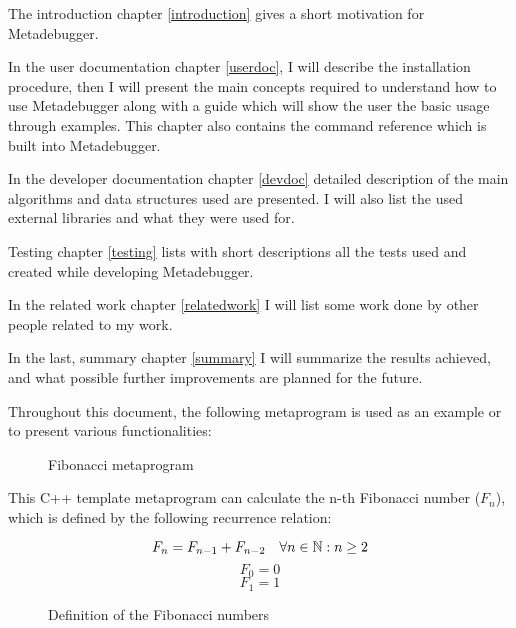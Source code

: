 The introduction chapter \ref{introduction} gives a short motivation for
Metadebugger.

In the user documentation chapter \ref{userdoc}, I will describe the
installation procedure, then I will present the main concepts required to
understand how to use Metadebugger along with a guide which will show the user
the basic usage through examples. This chapter also contains the command
reference which is built into Metadebugger.

In the developer documentation chapter \ref{devdoc} detailed description of the
main algorithms and data structures used are presented. I will also list the
used external libraries and what they were used for.

Testing chapter \ref{testing} lists with short descriptions all the tests used
and created while developing Metadebugger.

In the related work chapter \ref{relatedwork} I will list some work done by
other people related to my work.

In the last, summary chapter \ref{summary} I will summarize the results
achieved, and what possible further improvements are planned for the future.

Throughout this document, the following metaprogram is used as an example or to
present various functionalities:

\begin{figure}[H]
    \caption{Fibonacci metaprogram}
\end{figure}

This C++ template metaprogram can calculate the n-th Fibonacci number
(\(F_n\)), which is defined by the following recurrence relation:

\begin{figure}[H]
    \[
        F_n = F_{n-1} + F_{n-2} \quad \forall n \in \mathbb{N}: n \geq 2 \\
    \]
    \[
        F_0 = 0
    \]
    \[
        F_1 = 1
    \]
    \caption{Definition of the Fibonacci numbers}
\end{figure}
